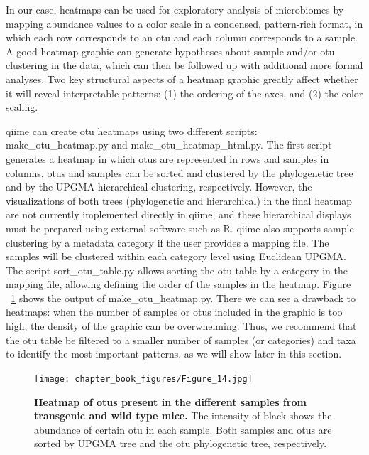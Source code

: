 In our case, heatmaps can be used for exploratory analysis of microbiomes by mapping
abundance values to a color scale in a condensed, pattern-rich format, in which each
row corresponds to an \gls{otu} and each column corresponds to a sample. A good heatmap
graphic can generate hypotheses about sample and/or \gls{otu} clustering in the data, which can
then be followed up with additional more formal analyses. Two key structural aspects of a
heatmap graphic greatly affect whether it will reveal interpretable patterns: (1) the ordering
of the axes, and (2) the color scaling.

\gls{qiime} can create \gls{otu} heatmaps using two different scripts: make\_otu\_heatmap.py and
make\_otu\_heatmap\_html.py. The first script generates a heatmap in which \gls{otu}s are
represented in rows and samples in columns. \gls{otu}s and samples can be sorted and clustered
by the phylogenetic tree and by the UPGMA hierarchical clustering, respectively. However,
the visualizations of both trees (phylogenetic and hierarchical) in the final heatmap
are not currently implemented directly in \gls{qiime}, and these hierarchical displays must be
prepared using external software such as R. \gls{qiime} also supports sample clustering by a metadata
category if the user provides a mapping file. The samples will be clustered within each category
level using Euclidean UPGMA. The script sort\_otu\_table.py allows sorting the \gls{otu} table by a
category in the mapping file, allowing defining the order of the samples in the heatmap.
Figure ~\ref{bfigure14} shows the output of make\_otu\_heatmap.py. There we can see a drawback
to heatmaps: when the number of samples or \gls{otu}s included in the graphic is too high, the density
of the graphic can be overwhelming. Thus, we recommend that the \gls{otu} table be filtered to a
smaller number of samples (or categories) and taxa to identify the most important patterns,
as we will show later in this section.

\begin{figure}[htbp]
\texttt{[image: chapter\_book\_figures/Figure\_14.jpg]}
\caption[Heatmap of \gls{otu}s present in the different samples from transgenic and wild type mice]{\textbf{Heatmap of \gls{otu}s present in the different samples from transgenic and wild type mice.}
The intensity of black shows the abundance of certain \gls{otu} in each sample.
Both samples and \gls{otu}s are sorted by UPGMA tree and the \gls{otu} phylogenetic tree, respectively.}
\label{bfigure14}
\end{figure}


